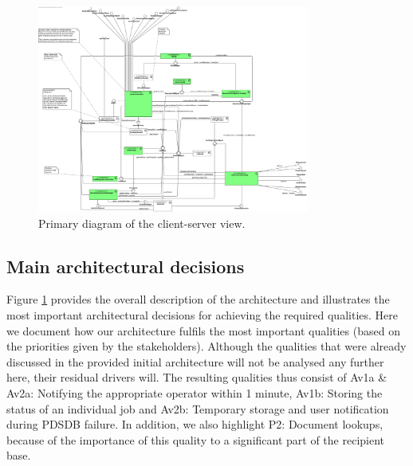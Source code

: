 \documentclass[a4paper,10pt]{article}
\begin{document}
\begin{figure}[!htp]
	\centering
	\includegraphics[width=0.8\textwidth]{ClientServerView.png}
	\caption{Primary diagram of the client-server view.}
	\label{fig:cs-primary}
\end{figure}
\FloatBarrier

\subsection{Main architectural decisions}
Figure \ref{fig:cs-primary} provides the overall description of the architecture and illustrates the most important architectural decisions for achieving the required qualities. Here we document how our architecture fulfils the most important qualities (based on the priorities given by the stakeholders). Although the qualities that were already discussed in the provided initial architecture will not be analysed any further here, their residual drivers will. The resulting qualities thus consist of Av1a \& Av2a: Notifying the appropriate operator within 1 minute, Av1b: Storing the status of an individual job and Av2b: Temporary storage and user notification during PDSDB failure. In addition, we also highlight P2: Document lookups, because of the importance of this quality to a significant part of the recipient base.
\end{document}
